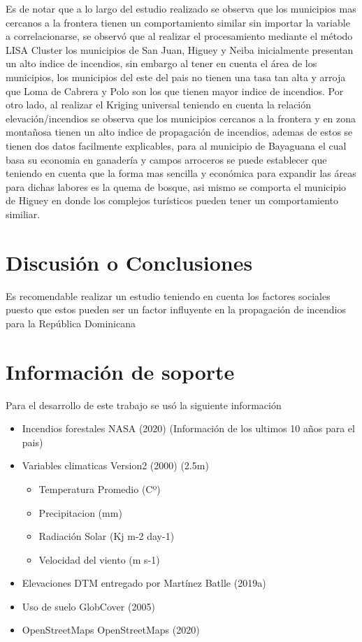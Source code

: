 \documentclass[11pt,]{article}
\providecommand{\tightlist}{%
\setlength{\itemsep}{0pt}\setlength{\parskip}{0pt}}
\begin{document}
Es de notar que a lo largo del estudio realizado se observa que los
municipios mas cercanos a la frontera tienen un comportamiento similar
sin importar la variable a correlacionarse, se observó que al realizar
el procesamiento mediante el método LISA Cluster los municipios de San
Juan, Higuey y Neiba inicialmente presentan un alto indice de incendios,
sin embargo al tener en cuenta el área de los municipios, los municipios
del este del pais no tienen una tasa tan alta y arroja que Loma de
Cabrera y Polo son los que tienen mayor indice de incendios. Por otro
lado, al realizar el Kriging universal teniendo en cuenta la relación
elevación/incendios se observa que los municipios cercanos a la frontera
y en zona montañosa tienen un alto indice de propagación de incendios,
ademas de estos se tienen dos datos facilmente explicables, para al
municipio de Bayaguana el cual basa su economia en ganadería y campos
arroceros se puede establecer que teniendo en cuenta que la forma mas
sencilla y económica para expandir las áreas para dichas labores es la
quema de bosque, asi mismo se comporta el municipio de Higuey en donde
los complejos turísticos pueden tener un comportamiento similiar.

\section{Discusión o Conclusiones}\label{discusiuxf3n-o-conclusiones}

Es recomendable realizar un estudio teniendo en cuenta los factores
sociales puesto que estos pueden ser un factor influyente en la
propagación de incendios para la República Dominicana

\section{Información de soporte}\label{informaciuxf3n-de-soporte}

Para el desarrollo de este trabajo se usó la siguiente información

\begin{itemize}
\tightlist
\item
  Incendios forestales NASA (2020) (Información de los ultimos 10 años
  para el pais)
\item
  Variables climaticas Version2 (2000) (2.5m)

  \begin{itemize}
  \tightlist
  \item
    Temperatura Promedio (Cº)
  \item
    Precipitacion (mm)
  \item
    Radiación Solar (Kj m-2 day-1)
  \item
    Velocidad del viento (m s-1)
  \end{itemize}
\item
  Elevaciones DTM entregado por Martínez Batlle (2019a)
\item
  Uso de suelo GlobCover (2005)
\item
  OpenStreetMaps OpenStreetMaps (2020)
\end{itemize}
\end{document}
